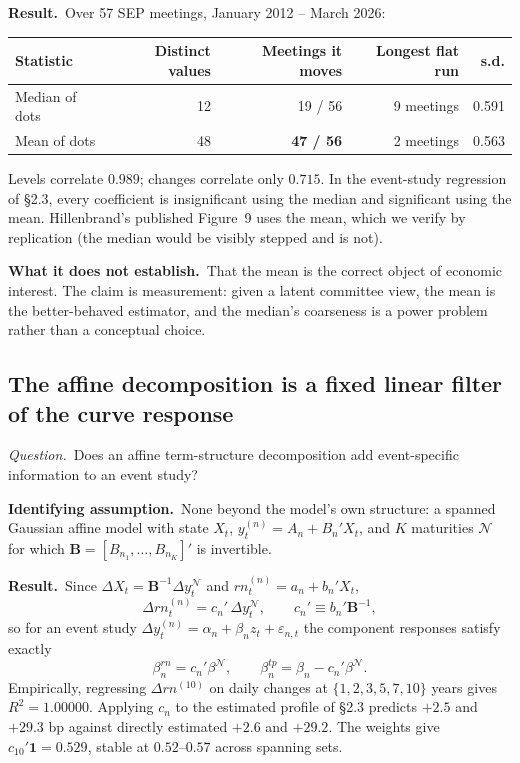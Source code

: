 \documentclass[11pt]{article}
\newcommand{\qq}[1]{\vspace{0.3em}\noindent\textit{Question.}\ #1}
\newcommand{\ia}[1]{\vspace{0.4em}\noindent\textbf{Identifying assumption.}\ #1}
\newcommand{\res}[1]{\vspace{0.4em}\noindent\textbf{Result.}\ #1}
\newcommand{\limn}[1]{\vspace{0.4em}\noindent\textbf{What it does not establish.}\ #1}
\begin{document}
\res{Over 57 SEP meetings, January 2012 -- March 2026:}
\begin{center}\small
\begin{tabular}{lrrrr}
\toprule
Statistic & Distinct values & Meetings it moves & Longest flat run & s.d.\\ \midrule
Median of dots & 12 & 19 / 56 & 9 meetings & 0.591\\
Mean of dots & 48 & \textbf{47 / 56} & 2 meetings & 0.563\\
\bottomrule\end{tabular}
\end{center}
\noindent Levels correlate $0.989$; changes correlate only $0.715$. In the event-study regression of \S2.3, every coefficient is insignificant using the median and significant using the mean. Hillenbrand's published Figure~9 uses the mean, which we verify by replication (the median would be visibly stepped and is not).

\limn{That the mean is the correct object of economic interest. The claim is measurement: given a latent committee view, the mean is the better-behaved estimator, and the median's coarseness is a power problem rather than a conceptual choice.}

\subsection{The affine decomposition is a fixed linear filter of the curve response}

\qq{Does an affine term-structure decomposition add event-specific information to an event study?}

\ia{None beyond the model's own structure: a spanned Gaussian affine model with state $X_t$, $y_t^{(n)}=A_n+B_n'X_t$, and $K$ maturities $\mathcal N$ for which $\mathbf B=[B_{n_1},\dots,B_{n_K}]'$ is invertible.}

\res{Since $\Delta X_t=\mathbf B^{-1}\Delta y_t^{\mathcal N}$ and $rn_t^{(n)}=a_n+b_n'X_t$,}
\begin{equation}
\Delta rn_t^{(n)}=c_n'\,\Delta y_t^{\mathcal N},\qquad c_n'\equiv b_n'\mathbf B^{-1},
\end{equation}
so for an event study $\Delta y^{(n)}_t=\alpha_n+\beta_n z_t+\varepsilon_{n,t}$ the component responses satisfy exactly
\begin{equation}
\beta_n^{rn}=c_n'\beta^{\mathcal N},\qquad \beta_n^{tp}=\beta_n-c_n'\beta^{\mathcal N}.
\end{equation}
Empirically, regressing $\Delta rn^{(10)}$ on daily changes at $\{1,2,3,5,7,10\}$ years gives $R^2=1.00000$. Applying $c_n$ to the estimated profile of \S2.3 predicts $+2.5$ and $+29.3$ bp against directly estimated $+2.6$ and $+29.2$. The weights give $c_{10}'\boldsymbol 1=0.529$, stable at $0.52$--$0.57$ across spanning sets.
\end{document}
